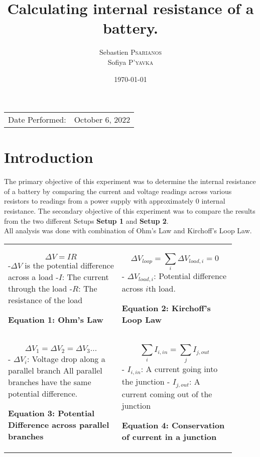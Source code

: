 \documentclass[
	letterpaper, %
	10pt, %
]{CSUniSchoolLabReport}
\title{Calculating internal resistance of a battery.}
\author{Sebastien \textsc{Psarianos}\\ Sofiya \textsc{P'yavka}}
\date{\today}
\begin{document}
\maketitle

\begin{center}
	\begin{tabular}{l r}
		Date Performed: & October 6, 2022 \\
	\end{tabular}
\end{center}
\section{Introduction}
The primary objective of this experiment was to determine the internal resistance of a battery by comparing
the current and voltage readings across various resistors to readings from a power supply with approximately
$0$ internal resistance. The secondary objective of this experiment was to compare the results from the two
different Setups \textbf{Setup 1} and \textbf{Setup 2}.\\

All analysis was done with combination of Ohm's Law and Kirchoff's Loop Law.\\

\begin{tabular}{p{0.45\linewidth} p{0.45\linewidth}}
    $$\Delta V = IR$$
    -$\Delta V$ is the potential difference across a load\newline
    -$I$: The current through the load\newline
    -$R$: The resistance of the load
    \begin{center}
        \textbf{Equation 1: Ohm's Law}
    \end{center}
    &
    $$\Delta V_{loop} = \sum_i \Delta V_{load, i} = 0$$
    - $\Delta V_{load,i}$: Potential difference across $i$th load.
    \begin{center}
        \textbf{Equation 2: Kirchoff's Loop Law}
    \end{center}\\
    $$\Delta V_1 = \Delta V_2 = \Delta V_3 ...$$
    - $\Delta V_{i}$: Voltage drop along a parallel branch\newline
    All parallel branches have the same potential\newline
    difference.
    \begin{center}
        \textbf{Equation 3: Potential Difference across parallel branches}
    \end{center}
    &
    $$\sum_i I_{i, in} = \sum_j I_{j,out}$$
    - $I_{i, in}$: A current going into the junction\newline
    - $I_{j,out}$: A current coming out of the junction
    \begin{center}
        \textbf{Equation 4: Conservation of current in a junction}
    \end{center}

\end{tabular}
\end{document}
